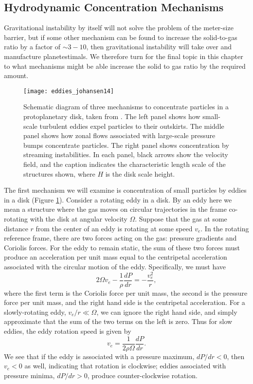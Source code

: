 \subsection{Hydrodynamic Concentration Mechanisms}

Gravitational instability by itself will not solve the problem of the meter-size barrier, but if some other mechanism can be found to increase the solid-to-gas ratio by a factor of $\sim 3-10$, then gravitational instability will take over and manufacture planetestimals. We therefore turn for the final topic in this chapter to what mechanisms might be able increase the solid to gas ratio by the required amount.

\begin{figure}
\texttt{[image: eddies\_johansen14]}
\caption[Schematic of particle concentration by eddies in a protoplanetary disk]{
\label{fig:eddies_johansen14a}
Schematic diagram of three mechanisms to concentrate particles in a protoplanetary disk, taken from \citet{johansen14a}. The left panel shows how small-scale turbulent eddies expel particles to their outskirts. The middle panel shows how zonal flows associated with large-scale pressure bumps concentrate particles. The right panel shows concentration by streaming instabilities. In each panel, black arrows show the velocity field, and the caption indicates the characteristic length scale of the structures shown, where $H$ is the disk scale height.
}
\end{figure}

The first mechanism we will examine is concentration of small particles by eddies in a disk (Figure \ref{fig:eddies_johansen14a}). Consider a rotating eddy in a disk. By an eddy here we mean a structure where the gas moves on circular trajectories in the frame co-rotating with the disk at angular velocity $\Omega$. Suppose that the gas at some distance $r$ from the center of an eddy is rotating at some speed $v_e$. In the rotating reference frame, there are two forces acting on the gas: pressure gradients and Coriolis forces. For the eddy to remain static, the sum of these two forces must produce an acceleration per unit mass equal to the centripetal acceleration associated with the circular motion of the eddy. Specifically, we must have
\begin{equation}
2\Omega v_e - \frac{1}{\rho} \frac{dP}{dr} = -\frac{v_e^2}{r},
\end{equation}
where the first term is the Coriolis force per unit mass, the second is the pressure force per unit mass, and the right hand side is the centripetal acceleration. For a slowly-rotating eddy, $v_e /r \ll \Omega$, we can ignore the right hand side, and simply approximate that the sum of the two terms on the left is zero. Thus for slow eddies, the eddy rotation speed is given by
\begin{equation}
v_e = \frac{1}{2\rho\Omega} \frac{dP}{dr}.
\end{equation}
We see that if the eddy is associated with a pressure maximum, $dP/dr < 0$, then $v_e < 0$ as well, indicating that rotation is clockwise; eddies associated with pressure minima, $dP/dr > 0$, produce counter-clockwise rotation.

